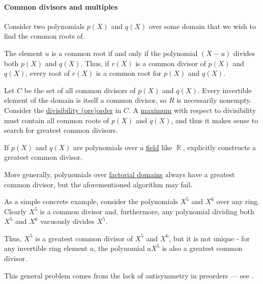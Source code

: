 \paragraph{Common divisors and multiples}

\begin{example}\label{ex:common_polynomial_divisors}
  Consider two polynomials \( p(X) \) and \( q(X) \) over some domain that we wish to find the common roots of.

  The element \( u \) is a common root if and only if the polynomial \( (X - u) \) divides both \( p(X) \) and \( q(X) \). Thus, if \( r(X) \) is a common divisor of \( p(X) \) and \( q(X) \), every root of \( r(X) \) is a common root for \( p(X) \) and \( q(X) \).

  Let \( C \) be the set of all common divisors of \( p(X) \) and \( q(X) \). Every invertible element of the domain is itself a common divisor, so \( R \) is necessarily nonempty. Consider the \hyperref[thm:semiring_divisibility_order]{divisibility (pre)order} in \( C \). A \hyperref[def:extremal_points/maximum_and_minimum]{maximum} with respect to divisibility must contain all common roots of \( p(X) \) and \( q(X) \), and thus it makes sense to search for greatest common divisors.

  \begin{thmenum}
     If \( p(X) \) and \( q(X) \) are polynomials over a \hyperref[def:field]{field} like \( \BbbR \),  explicitly constructs a greatest common divisor.

     More generally, polynomials over \hyperref[def:factorial_domain]{factorial domains} always have a greatest common divisor, but the aforementioned algorithm may fail.

     As a simple concrete example, consider the polynomials \( X^5 \) and \( X^6 \) over any ring. Clearly \( X^5 \) is a common divisor and, furthermore, any polynomial dividing both \( X^5 \) and \( X^6 \) vacuously divides \( X^5 \).

    Thus, \( X^5 \) is a greatest common divisor of \( X^5 \) and \( X^6 \), but it is not unique - for any invertible ring element \( a \), the polynomial \( a X^5 \) is also a greatest common divisor.

    This general problem comes from the lack of antisymmetry in preorders --- see .


\end{thmenum}
\end{example}

